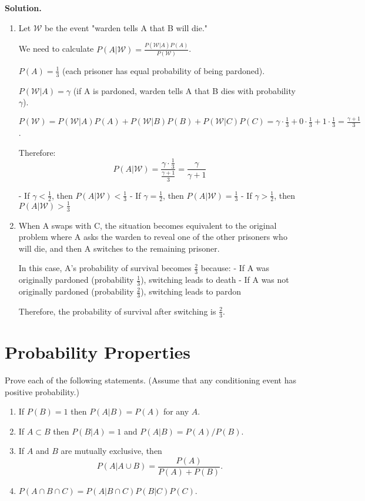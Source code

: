 \noindent\textbf{Solution.}
\begin{enumerate}[label=(\alph*)]
    \item Let $\mathcal{W}$ be the event "warden tells A that B will die."
    
    We need to calculate $P(A|\mathcal{W}) = \frac{P(\mathcal{W}|A)P(A)}{P(\mathcal{W})}$.
    
    $P(A) = \frac{1}{3}$ (each prisoner has equal probability of being pardoned).
    
    $P(\mathcal{W}|A) = \gamma$ (if A is pardoned, warden tells A that B dies with probability $\gamma$).
    
    $P(\mathcal{W}) = P(\mathcal{W}|A)P(A) + P(\mathcal{W}|B)P(B) + P(\mathcal{W}|C)P(C) = \gamma \cdot \frac{1}{3} + 0 \cdot \frac{1}{3} + 1 \cdot \frac{1}{3} = \frac{\gamma + 1}{3}$.
    
    Therefore:
    \[ P(A|\mathcal{W}) = \frac{\gamma \cdot \frac{1}{3}}{\frac{\gamma + 1}{3}} = \frac{\gamma}{\gamma + 1} \]
    
    - If $\gamma < \frac{1}{2}$, then $P(A|\mathcal{W}) < \frac{1}{3}$
    - If $\gamma = \frac{1}{2}$, then $P(A|\mathcal{W}) = \frac{1}{3}$
    - If $\gamma > \frac{1}{2}$, then $P(A|\mathcal{W}) > \frac{1}{3}$
    
    \item When A swaps with C, the situation becomes equivalent to the original problem where A asks the warden to reveal one of the other prisoners who will die, and then A switches to the remaining prisoner.
    
    In this case, A's probability of survival becomes $\frac{2}{3}$ because:
    - If A was originally pardoned (probability $\frac{1}{3}$), switching leads to death
    - If A was not originally pardoned (probability $\frac{2}{3}$), switching leads to pardon
    
    Therefore, the probability of survival after switching is $\frac{2}{3}$.
\end{enumerate}


\section{Probability Properties}

\begin{problembox}
Prove each of the following statements. (Assume that any conditioning event has positive probability.)
\begin{enumerate}[label=(\alph*)]
    \item If $P(B)=1$ then $P(A|B)=P(A)$ for any $A$.
    \item If $A\subset B$ then $P(B|A)=1$ and $P(A|B)=P(A)/P(B)$.
    \item If $A$ and $B$ are mutually exclusive, then
    \[ P(A|A\cup B)=\frac{P(A)}{P(A)+P(B)}. \]
    \item $P(A\cap B\cap C)=P(A|B\cap C)P(B|C)P(C)$.
\end{enumerate}
\end{problembox}

